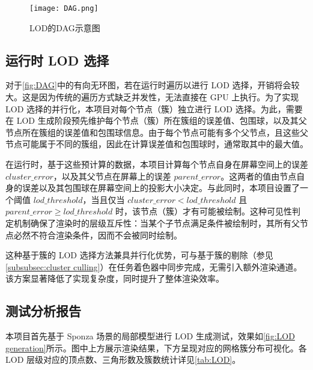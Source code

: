 \begin{figure}[ht]
    \centering
    \texttt{[image: DAG.png]}
    \caption{\label{fig:DAG}LOD的DAG示意图}
\end{figure}

\subsection{运行时 LOD 选择} \label{subsec:run-time lod select}

\par 对于\autoref{fig:DAG}中的有向无环图，若在运行时遍历以进行 LOD 选择，开销将会较大。这是因为传统的遍历方式缺乏并发性，无法直接在 GPU 上执行。为了实现 LOD 选择的并行化，本项目对每个节点（簇）独立进行 LOD 选择。为此，需要在 LOD 生成阶段预先维护每个节点（簇）所在簇组的误差值、包围球，以及其父节点所在簇组的误差值和包围球信息\cite{WangQian2016}。由于每个节点可能有多个父节点，且这些父节点可能属于不同的簇组，因此在计算误差值和包围球时，通常取其中的最大值。

在运行时，基于这些预计算的数据，本项目计算每个节点自身在屏幕空间上的误差 $cluster\_error$，以及其父节点在屏幕上的误差 $parent\_error$。这两者的值由节点自身的误差以及其包围球在屏幕空间上的投影大小决定。与此同时，本项目设置了一个阈值 $lod\_threshold$，当且仅当 $cluster\_error < lod\_threshold$ 且 $parent\_error \geq lod\_threshold$ 时，该节点（簇）才有可能被绘制。这种可见性判定机制确保了渲染时的层级互斥性：当某个子节点满足条件被绘制时，其所有父节点必然不符合渲染条件，因而不会被同时绘制。

这种基于簇的 LOD 选择方法兼具并行化优势，可与基于簇的剔除（参见\ref{subsubsec:cluster culling}）在任务着色器中同步完成，无需引入额外渲染通道。该方案显著降低了实现复杂度，同时提升了整体渲染效率。

\subsection{测试分析报告}

本项目首先基于 Sponza 场景的局部模型进行 LOD 生成测试，效果如\autoref{fig:LOD generation}所示。图中上方展示渲染结果，下方呈现对应的网格簇分布可视化。各 LOD 层级对应的顶点数、三角形数及簇数统计详见\autoref{tab:LOD}。


